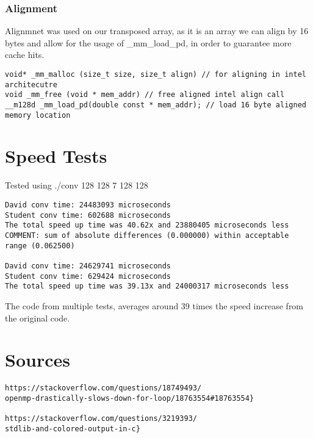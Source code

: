 \documentclass[12pt,fleqn,leqno,letterpaper]{article}
\begin{document}
\subsubsection{Alignment}
Alignmnet was used on our transposed array, as it is an array we can align by 16 bytes and allow
for the usage of \_mm\_load\_pd, in order to guarantee more cache hits.

\begin{verbatim}
void* _mm_malloc (size_t size, size_t align) // for aligning in intel architecutre
void _mm_free (void * mem_addr) // free aligned intel align call
__m128d _mm_load_pd(double const * mem_addr); // load 16 byte aligned memory location
\end{verbatim}

\section{Speed Tests}
Tested using ./conv 128 128 7 128 128 
\begin{verbatim}
David conv time: 24483093 microseconds
Student conv time: 602688 microseconds
The total speed up time was 40.62x and 23880405 microseconds less
COMMENT: sum of absolute differences (0.000000) within acceptable range (0.062500)

David conv time: 24629741 microseconds
Student conv time: 629424 microseconds
The total speed up time was 39.13x and 24000317 microseconds less
\end{verbatim}
The code from multiple tests, averages around 39 times the speed increase from the original
code.

\section{Sources}
\begin{verbatim}
https://stackoverflow.com/questions/18749493/
openmp-drastically-slows-down-for-loop/18763554#18763554}

https://stackoverflow.com/questions/3219393/
stdlib-and-colored-output-in-c}
\end{verbatim}
%
\end{document}
